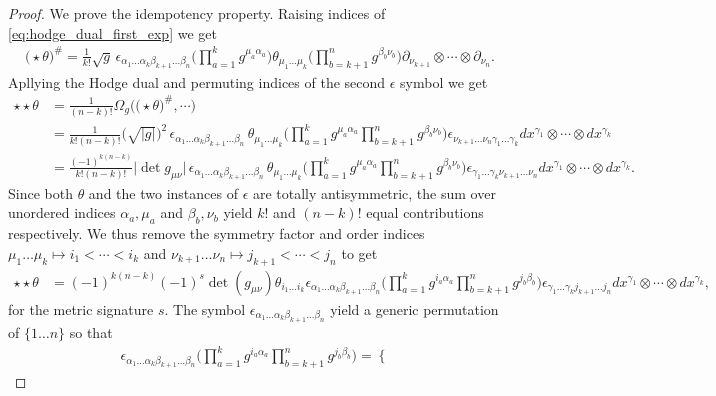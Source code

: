 \documentclass[../geometry_main.tex]{subfiles}
\begin{document}
\begin{proof}
We prove the idempotency property. Raising indices of \eqref{eq:hodge_dual_first_exp} we get
{\small
\begin{align}
\big(\star\theta\big)^\#= \tfrac{1}{k!}\sqrt{g}\,\epsilon_{\alpha_1\dots \alpha_k\beta_{k+1}\dots \beta_n} \Big(\prod_{a=1}^k g^{\mu_a \alpha_a}\Big) \theta_{\mu_1 \dots \mu_k} \Big(\prod_{b=k+1}^n g^{\beta_b\nu_b}\Big) \partial_{\nu_{k+1}}\otimes \cdots \otimes \partial_{\nu_n}.
\end{align}}
Apllying the Hodge dual and permuting indices of the second $\epsilon$ symbol we get 
{\small
\begin{align}
\star\star\theta &= \tfrac{1}{(n-k)!}\Omega_g\Big(\big(\star\theta\big)^\#, \cdots\Big)\\
&= \tfrac{1}{k!(n-k)!}\big(\sqrt{|g|}\big)^2\,\epsilon_{\alpha_1\dots \alpha_k\beta_{k+1}\dots \beta_n}\,\theta_{\mu_1 \dots \mu_k} \Big(\prod_{a=1}^k g^{\mu_a \alpha_a}\prod_{b=k+1}^n g^{\beta_b\nu_b}\Big) \epsilon_{\nu_{k+1}\dots \nu_n\gamma_1\dots \gamma_k} dx^{\gamma_1} \otimes \cdots \otimes dx^{\gamma_k}\\
&= \tfrac{(-1)^{k(n-k)}}{k!(n-k)!}\big|\!\det{g_{\mu\nu}}\!\big|\,\epsilon_{\alpha_1\dots \alpha_k\beta_{k+1}\dots \beta_n}\,\theta_{\mu_1 \dots \mu_k} \Big(\prod_{a=1}^k g^{\mu_a \alpha_a}\prod_{b=k+1}^n g^{\beta_b\nu_b}\Big) \epsilon_{\gamma_1\dots \gamma_k\nu_{k+1}\dots \nu_n} dx^{\gamma_1} \otimes \cdots \otimes dx^{\gamma_k}.
\end{align}}
Since both $\theta$ and the two instances of $\epsilon$ are totally antisymmetric, the sum over unordered indices $\alpha_a, \mu_a$ and $\beta_b,\nu_b$ yield $k!$ and $(n-k)!$ equal contributions respectively.
We thus remove the symmetry factor and order indices $\mu_1\dots\mu_k\mapsto i_1<\cdots < i_k$ and $\nu_{k+1}\dots \nu_n\mapsto j_{k+1}<\cdots < j_n$ to get
{\small
\begin{align}
\star\star\theta &= (-1)^{k(n-k)}(-1)^s\det(g_{\mu\nu})\theta_{i_1 \dots i_k} \epsilon_{\alpha_1\dots \alpha_k\beta_{k+1}\dots \beta_n}\Big(\prod_{a=1}^k g^{i_a \alpha_a}\prod_{b=k+1}^n g^{j_b\beta_b}\Big) \epsilon_{\gamma_1\dots \gamma_k j_{k+1}\dots j_n} dx^{\gamma_1} \otimes \cdots \otimes dx^{\gamma_k},
\end{align}}
for the metric signature $s$.
The symbol $\epsilon_{\alpha_1\dots \alpha_k\beta_{k+1}\dots \beta_n}$ yield a generic permutation of $\{1\dots n\}$ so that
{\small
\begin{align}
\epsilon_{\alpha_1\dots \alpha_k\beta_{k+1}\dots \beta_n}\Big(\prod_{a=1}^k g^{i_a \alpha_a}\prod_{b=k+1}^n g^{j_b\beta_b}\Big) = \begin{cases}

\end{cases}
\end{align}}
\end{proof}
\end{document}
